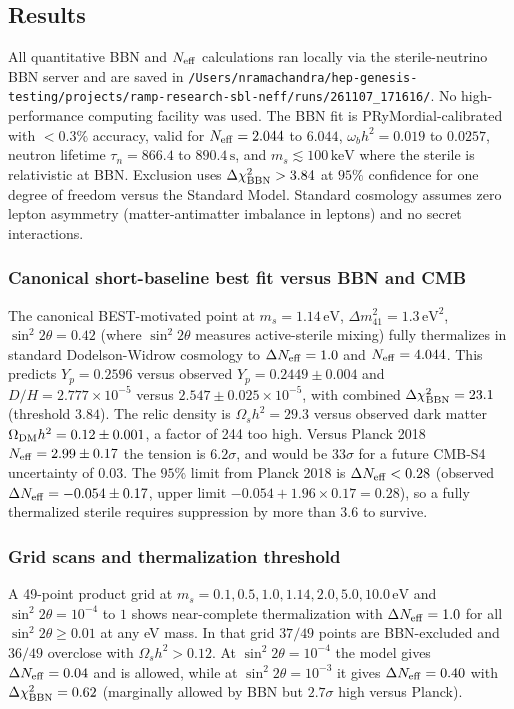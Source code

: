 \documentclass[11pt,a4paper]{article}
\begin{document}
\subsection{Results}
All quantitative BBN and $N_{\rm eff}$ calculations ran locally via the sterile-neutrino BBN server and are saved in \texttt{/\allowbreak{}Users/\allowbreak{}nramachandra/\allowbreak{}hep-genesis-testing/\allowbreak{}projects/\allowbreak{}ramp-research-sbl-neff/\allowbreak{}runs/\allowbreak{}261107\_\allowbreak{}171616/\allowbreak{}}. No high-performance computing facility was used. The BBN fit is PRyMordial-calibrated with $<0.3\%$ accuracy, valid for $N_{\rm eff} = 2.044$ to $6.044$, $\omega_b h^2 = 0.019$ to $0.0257$, neutron lifetime $\tau_n = 866.4$ to $890.4\,\mathrm{s}$, and $m_s \lesssim 100\,\mathrm{keV}$ where the sterile is relativistic at BBN. Exclusion uses $\Delta\chi^2_{\rm BBN} > 3.84$ at $95\%$ confidence for one degree of freedom versus the Standard Model. Standard cosmology assumes zero lepton asymmetry (matter-antimatter imbalance in leptons) and no secret interactions.

\subsubsection{Canonical short-baseline best fit versus BBN and CMB}
The canonical BEST-motivated point at $m_s = 1.14\,\mathrm{eV}$, $\Delta m^2_{41} = 1.3\,\mathrm{eV}^2$, $\sin^2 2\theta = 0.42$ (where $\sin^2 2\theta$ measures active-sterile mixing) fully thermalizes in standard Dodelson-Widrow cosmology to $\Delta N_{\rm eff} = 1.0$ and $N_{\rm eff} = 4.044$. This predicts $Y_p = 0.2596$ versus observed $Y_p = 0.2449 \pm 0.004$ and $D/H = 2.777 \times 10^{-5}$ versus $2.547 \pm 0.025 \times 10^{-5}$, with combined $\Delta\chi^2_{\rm BBN} = 23.1$ (threshold $3.84$). The relic density is $\Omega_s h^2 = 29.3$ versus observed dark matter $\Omega_{\rm DM} h^2 = 0.12 \pm 0.001$, a factor of 244 too high. Versus Planck 2018 $N_{\rm eff} = 2.99 \pm 0.17$ the tension is $6.2\sigma$, and would be $33\sigma$ for a future CMB-S4 uncertainty of $0.03$. The $95\%$ limit from Planck 2018 is $\Delta N_{\rm eff} < 0.28$ (observed $\Delta N_{\rm eff} = -0.054 \pm 0.17$, upper limit $-0.054 + 1.96 \times 0.17 = 0.28$), so a fully thermalized sterile requires suppression by more than $3.6$ to survive.

\subsubsection{Grid scans and thermalization threshold}
A 49-point product grid at $m_s = 0.1, 0.5, 1.0, 1.14, 2.0, 5.0, 10.0\,\mathrm{eV}$ and $\sin^2 2\theta = 10^{-4}$ to $1$ shows near-complete thermalization with $\Delta N_{\rm eff} = 1.0$ for all $\sin^2 2\theta \ge 0.01$ at any eV mass. In that grid $37/49$ points are BBN-excluded and $36/49$ overclose with $\Omega_s h^2 > 0.12$. At $\sin^2 2\theta = 10^{-4}$ the model gives $\Delta N_{\rm eff} = 0.04$ and is allowed, while at $\sin^2 2\theta = 10^{-3}$ it gives $\Delta N_{\rm eff} = 0.40$ with $\Delta\chi^2_{\rm BBN} = 0.62$ (marginally allowed by BBN but $2.7\sigma$ high versus Planck).
\end{document}
